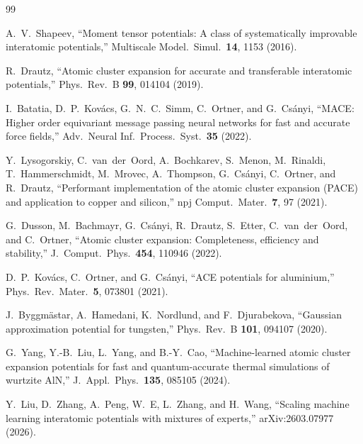 \documentclass[twoside,prb,aps,floatfix,superscriptaddress,longbibliography]{revtex4-2}
\begin{document}
\begin{acknowledgments}
\end{acknowledgments}


\begin{thebibliography}{99}

A.~V.~Shapeev, ``Moment tensor potentials: A class of systematically improvable interatomic potentials,'' Multiscale Model.\ Simul.\ \textbf{14}, 1153 (2016).

R.~Drautz, ``Atomic cluster expansion for accurate and transferable interatomic potentials,'' Phys.\ Rev.\ B \textbf{99}, 014104 (2019).

I.~Batatia, D.~P.~Kov\'{a}cs, G.~N.~C.~Simm, C.~Ortner, and G.~Cs\'{a}nyi, ``MACE: Higher order equivariant message passing neural networks for fast and accurate force fields,'' Adv.\ Neural Inf.\ Process.\ Syst.\ \textbf{35} (2022).

Y.~Lysogorskiy, C.~van~der~Oord, A.~Bochkarev, S.~Menon, M.~Rinaldi, T.~Hammerschmidt, M.~Mrovec, A.~Thompson, G.~Cs\'{a}nyi, C.~Ortner, and R.~Drautz, ``Performant implementation of the atomic cluster expansion (PACE) and application to copper and silicon,'' npj Comput.\ Mater.\ \textbf{7}, 97 (2021).

G.~Dusson, M.~Bachmayr, G.~Cs\'{a}nyi, R.~Drautz, S.~Etter, C.~van~der~Oord, and C.~Ortner, ``Atomic cluster expansion: Completeness, efficiency and stability,'' J.\ Comput.\ Phys.\ \textbf{454}, 110946 (2022).

D.~P.~Kov\'{a}cs, C.~Ortner, and G.~Cs\'{a}nyi, ``ACE potentials for aluminium,'' Phys.\ Rev.\ Mater.\ \textbf{5}, 073801 (2021).

J.~Byggm\"{a}star, A.~Hamedani, K.~Nordlund, and F.~Djurabekova, ``Gaussian approximation potential for tungsten,'' Phys.\ Rev.\ B \textbf{101}, 094107 (2020).

G.~Yang, Y.-B.~Liu, L.~Yang, and B.-Y.~Cao, ``Machine-learned atomic cluster expansion potentials for fast and quantum-accurate thermal simulations of wurtzite AlN,'' J.\ Appl.\ Phys.\ \textbf{135}, 085105 (2024).

Y.~Liu, D.~Zhang, A.~Peng, W.~E, L.~Zhang, and H.~Wang, ``Scaling machine learning interatomic potentials with mixtures of experts,'' arXiv:2603.07977 (2026).


\end{thebibliography}
\end{document}
